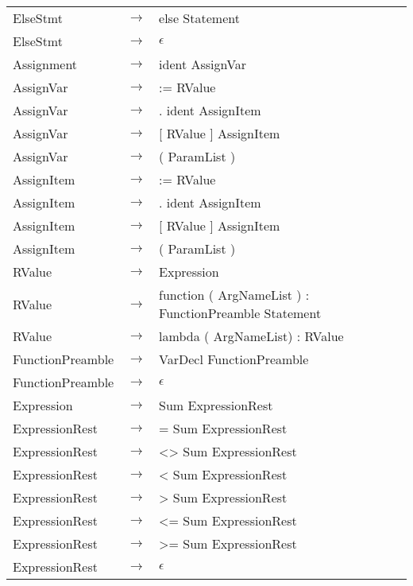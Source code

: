 \documentclass[10pt,a4paper]{article}
\begin{document}
\begin{longtable}{ l c l }
	ElseStmt         & $\rightarrow$ & else Statement \\
	ElseStmt         & $\rightarrow$ & $\epsilon$ \\

	Assignment       & $\rightarrow$ & ident AssignVar \\
	
	AssignVar        & $\rightarrow$ & := RValue \\
	AssignVar        & $\rightarrow$ & . ident AssignItem \\
	AssignVar        & $\rightarrow$ & [ RValue ] AssignItem \\
	AssignVar        & $\rightarrow$ & ( ParamList ) \\

	AssignItem       & $\rightarrow$ & := RValue \\
	AssignItem       & $\rightarrow$ & . ident AssignItem \\
	AssignItem       & $\rightarrow$ & [ RValue ] AssignItem \\
	AssignItem       & $\rightarrow$ & ( ParamList ) \\

	RValue           & $\rightarrow$ & Expression \\
	RValue           & $\rightarrow$ & function ( ArgNameList ) : FunctionPreamble Statement \\
	RValue           & $\rightarrow$ & lambda ( ArgNameList) : RValue \\
	
	FunctionPreamble & $\rightarrow$ & VarDecl FunctionPreamble \\
	FunctionPreamble & $\rightarrow$ & $\epsilon$ \\

	Expression       & $\rightarrow$ & Sum ExpressionRest \\
	
	ExpressionRest   & $\rightarrow$ & = Sum ExpressionRest \\
	ExpressionRest   & $\rightarrow$ & <> Sum ExpressionRest \\
	ExpressionRest   & $\rightarrow$ & < Sum ExpressionRest \\
	ExpressionRest   & $\rightarrow$ & > Sum ExpressionRest \\
	ExpressionRest   & $\rightarrow$ & <= Sum ExpressionRest \\
	ExpressionRest   & $\rightarrow$ & >= Sum ExpressionRest \\
	ExpressionRest   & $\rightarrow$ & $\epsilon$ \\


\end{longtable}
\end{document}
